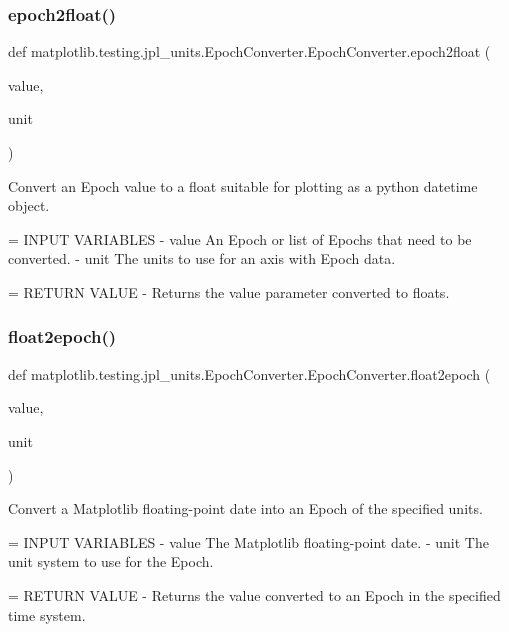 \subsubsection{\texorpdfstring{epoch2float()}{epoch2float()}}
{\footnotesize\ttfamily def matplotlib.\+testing.\+jpl\+\_\+units.\+Epoch\+Converter.\+Epoch\+Converter.\+epoch2float (\begin{DoxyParamCaption}\item[{}]{value,  }\item[{}]{unit }\end{DoxyParamCaption})\hspace{0.3cm}{\ttfamily [static]}}

\begin{DoxyVerb}Convert an Epoch value to a float suitable for plotting as a python
datetime object.

= INPUT VARIABLES
- value    An Epoch or list of Epochs that need to be converted.
- unit     The units to use for an axis with Epoch data.

= RETURN VALUE
- Returns the value parameter converted to floats.
\end{DoxyVerb}
 \mbox{\label{classmatplotlib_1_1testing_1_1jpl__units_1_1EpochConverter_1_1EpochConverter_a0bf9beda17b7240aa3fcf9307c577b7a}} 
\subsubsection{\texorpdfstring{float2epoch()}{float2epoch()}}
{\footnotesize\ttfamily def matplotlib.\+testing.\+jpl\+\_\+units.\+Epoch\+Converter.\+Epoch\+Converter.\+float2epoch (\begin{DoxyParamCaption}\item[{}]{value,  }\item[{}]{unit }\end{DoxyParamCaption})\hspace{0.3cm}{\ttfamily [static]}}

\begin{DoxyVerb}Convert a Matplotlib floating-point date into an Epoch of the specified
units.

= INPUT VARIABLES
- value     The Matplotlib floating-point date.
- unit      The unit system to use for the Epoch.

= RETURN VALUE
- Returns the value converted to an Epoch in the specified time system.
\end{DoxyVerb}
 

